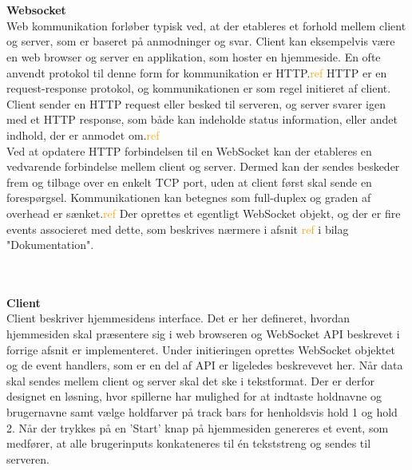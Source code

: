 \documentclass[Rapport/Rapport_main.tex]{subfiles}
\begin{document}
\\\\\textbf{Websocket}
\\Web kommunikation forløber typisk ved, at der etableres et forhold mellem client og server, som er baseret på anmodninger og svar. Client kan eksempelvis være en web browser og server en applikation, som hoster en hjemmeside. En ofte anvendt protokol til denne form for kommunikation er HTTP.\textcolor{orange}{ref} HTTP er en request-response protokol, og kommunikationen er som regel initieret af client. Client sender en HTTP request eller besked til serveren, og server svarer igen med et HTTP response, som både kan indeholde status information, eller andet indhold, der er anmodet om.\textcolor{orange}{ref} \\Ved at opdatere HTTP forbindelsen til en WebSocket kan der etableres en vedvarende forbindelse mellem client og server. Dermed kan der sendes beskeder frem og tilbage over en enkelt TCP port, uden at client først skal sende en forespørgsel. Kommunikationen kan betegnes som full-duplex og graden af overhead er sænket.\textcolor{orange}{ref} Der oprettes et egentligt WebSocket objekt, og der er fire events associeret med dette, som beskrives nærmere i afsnit \textcolor{orange}{ref} i bilag "Dokumentation". 

\\\\\textbf{Client}
\\Client beskriver hjemmesidens interface. Det er her defineret, hvordan hjemmesiden skal præsentere sig i web browseren og WebSocket API beskrevet i forrige afsnit er implementeret. Under initieringen oprettes WebSocket objektet og de event handlers, som er en del af API er ligeledes beskrevevet her. Når data skal sendes mellem client og server skal det ske i tekstformat. Der er derfor designet en løsning, hvor spillerne har mulighed for at indtaste holdnavne og brugernavne samt vælge holdfarver på track bars for henholdsvis hold 1 og hold 2. Når der trykkes på en 'Start' knap på hjemmesiden genereres et event, som medfører, at alle brugerinputs konkateneres til én tekststreng og sendes til serveren.
\end{document}

